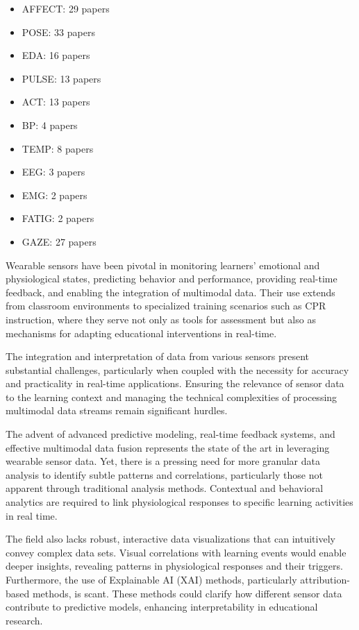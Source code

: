 \documentclass[manuscript,screen,review]{acmart}
\begin{document}
\begin{itemize}
    \item AFFECT: 29 papers
    \item POSE: 33 papers
    \item EDA: 16 papers
    \item PULSE: 13 papers
    \item ACT: 13 papers
    \item BP: 4 papers
    \item TEMP: 8 papers
    \item EEG: 3 papers
    \item EMG: 2 papers
    \item FATIG: 2 papers
    \item GAZE: 27 papers
\end{itemize}

Wearable sensors have been pivotal in monitoring learners' emotional and physiological states, predicting behavior and performance, providing real-time feedback, and enabling the integration of multimodal data. Their use extends from classroom environments to specialized training scenarios such as CPR instruction, where they serve not only as tools for assessment but also as mechanisms for adapting educational interventions in real-time.

The integration and interpretation of data from various sensors present substantial challenges, particularly when coupled with the necessity for accuracy and practicality in real-time applications. Ensuring the relevance of sensor data to the learning context and managing the technical complexities of processing multimodal data streams remain significant hurdles.

The advent of advanced predictive modeling, real-time feedback systems, and effective multimodal data fusion represents the state of the art in leveraging wearable sensor data. Yet, there is a pressing need for more granular data analysis to identify subtle patterns and correlations, particularly those not apparent through traditional analysis methods. Contextual and behavioral analytics are required to link physiological responses to specific learning activities in real time.

The field also lacks robust, interactive data visualizations that can intuitively convey complex data sets. Visual correlations with learning events would enable deeper insights, revealing patterns in physiological responses and their triggers. Furthermore, the use of Explainable AI (XAI) methods, particularly attribution-based methods, is scant. These methods could clarify how different sensor data contribute to predictive models, enhancing interpretability in educational research.
\end{document}
